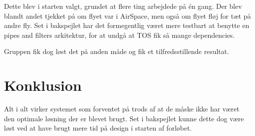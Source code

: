 Dette blev i starten valgt, grundet at flere ting arbejdede på én gang. Der blev blandt andet tjekket på om flyet var i AirSpace, men også om flyet fløj for tæt på andre fly. \tabularnewline
Set i bakspejlet har det formegentlig været mere testbart at benytte en pipes and filters arkitektur, for at undgå at TOS fik så mange dependencies.

Gruppen fik dog løst det på anden måde og fik et tilfredsstillende resultat.

\section{Konklusion}
Alt i alt virker systemet som forventet på trods af at de måske ikke har været den optimale løsning der er blevet brugt. \tabularnewline
Set i bakspejlet kunne dette dog være løst ved at have brugt mere tid på design i starten af forløbet. 